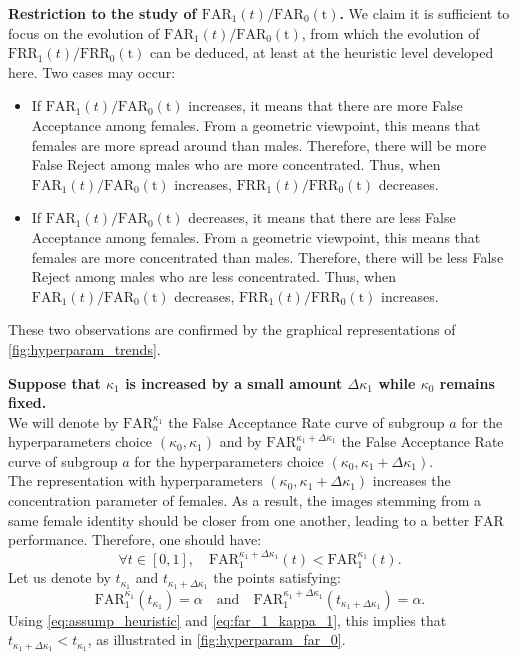 \documentclass[nohyperref]{article}
\theoremstyle{plain}
\theoremstyle{definition}
\theoremstyle{remark}
\begin{document}
{\bf Restriction to the study of $\mathrm{FAR}_1(t)/\mathrm{FAR_0(t)}$.} We claim it is sufficient to focus on the evolution of $\mathrm{FAR}_1(t)/\mathrm{FAR_0(t)}$, from which the evolution of $\mathrm{FRR}_1(t)/\mathrm{FRR_0(t)}$ can be deduced, at least at the heuristic level developed here. Two cases may occur:
\begin{itemize}
    \item If $\mathrm{FAR}_1(t)/\mathrm{FAR_0(t)}$ increases, it means that there are more False Acceptance among females. From a geometric viewpoint, this means that females are more spread around than males. Therefore, there will be more False Reject among males who are more concentrated. Thus, when $\mathrm{FAR}_1(t)/\mathrm{FAR_0(t)}$ increases, $\mathrm{FRR}_1(t)/\mathrm{FRR_0(t)}$ decreases.
    \item If $\mathrm{FAR}_1(t)/\mathrm{FAR_0(t)}$ decreases, it means that there are less False Acceptance among females. From a geometric viewpoint, this means that females are more concentrated than males. Therefore, there will be less False Reject among males who are less concentrated. Thus, when $\mathrm{FAR}_1(t)/\mathrm{FAR_0(t)}$ decreases, $\mathrm{FRR}_1(t)/\mathrm{FRR_0(t)}$ increases.
\end{itemize}
These two observations are confirmed by the graphical representations of \autoref{fig:hyperparam_trends}.


\smallskip

{\bf Suppose that $\kappa_1$ is increased by a small amount $\Delta \kappa_1$ while $\kappa_0$ remains fixed.} \\
We will denote by $\mathrm{FAR}_a^{\kappa_1}$ the False Acceptance Rate curve of subgroup $a$ for the hyperparameters choice $(\kappa_0, \kappa_1)$ and by $\mathrm{FAR}_a^{\kappa_1 + \Delta \kappa_1}$ the False Acceptance Rate curve of subgroup $a$ for the hyperparameters choice $(\kappa_0, \kappa_1 + \Delta \kappa_1)$.\\
The representation with hyperparameters $(\kappa_0, \kappa_1 + \Delta \kappa_1)$ increases the concentration parameter of females. As a result, the images stemming from a same female identity should be closer from one another, leading to a better $\mathrm{FAR}$ performance. Therefore, one should have:
\begin{equation} \label{eq:far_1_kappa_1}
\forall t \in [0,1], \quad \mathrm{FAR}_1^{\kappa_1 + \Delta \kappa_1}(t) < \mathrm{FAR}_1^{\kappa_1}(t). 
\end{equation}
Let us denote by $t_{\kappa_1}$ and $t_{\kappa_1 + \Delta \kappa_1}$ the points satisfying:
\[ \mathrm{FAR}_1^{\kappa_1}(t_{\kappa_1}) = \alpha \quad \text{and} \quad \mathrm{FAR}_1^{\kappa_1 + \Delta \kappa_1}(t_{\kappa_1 + \Delta \kappa_1}) = \alpha. \]
Using \autoref{eq:assump_heuristic} and \autoref{eq:far_1_kappa_1}, this implies that $t_{\kappa_1 + \Delta \kappa_1} < t_{\kappa_1}$, as illustrated in \autoref{fig:hyperparam_far_0}.
\end{document}
